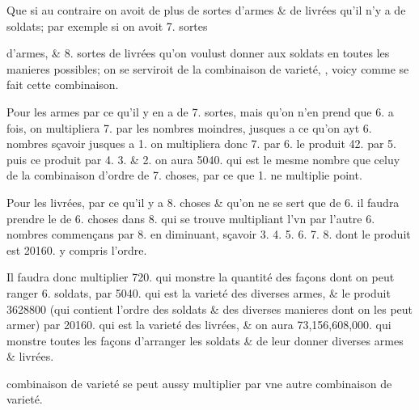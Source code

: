 \documentclass[11pt,a4paper]{article}
\begin{document}
Que si au contraire on avoit de plus de sortes d'armes \& de livrées qu'il n'y a de soldats; par exemple si on avoit 7. sortes


d'armes, \& 8. sortes de livrées  qu'on voulust donner aux soldats en toutes les manieres possibles; on se serviroit de la combinaison de varieté, , voicy comme se fait cette combinaison.

Pour les armes par ce qu'il y en a de 7. sortes, mais qu'on n'en prend que 6. a  fois, on multipliera 7. par les nombres moindres, jusques a ce qu'on ayt 6. nombres sçavoir jusques a 1. on multipliera donc 7. par 6. le produit 42. par 5. puis ce produit par 4. 3. \& 2. on aura 5040. qui est le mesme nombre que celuy \struck{\ill{}} de la combinaison d'ordre de 7. choses, par ce que 1. ne multiplie point.

Pour les livrées, par ce qu'il y a 8. choses \& qu'on ne se sert que de 6. il faudra prendre le  de 6. choses  dans 8. qui se trouve multipliant l'vn par l'autre 6. nombres commençans par 8. en diminuant, sçavoir 3. 4. 5. 6. 7. 8. dont le produit est 20160. y compris l'ordre.

Il faudra donc multiplier 720. qui monstre la quantité des façons dont on peut ranger 6. soldats, par 5040. qui est la varieté des diverses armes, \& le produit 3628800 (qui contient l'ordre des soldats \& des diverses manieres dont on les peut armer) par 20160. qui est la varieté des livrées, \& on aura 73,156,608,000. qui monstre toutes les façons d'arranger les soldats \& de leur donner diverses armes \& livrées.

\ill{} \struck{\ill{}} combinaison de varieté se peut aussy multiplier par vne autre combinaison de varieté.
\end{document}
